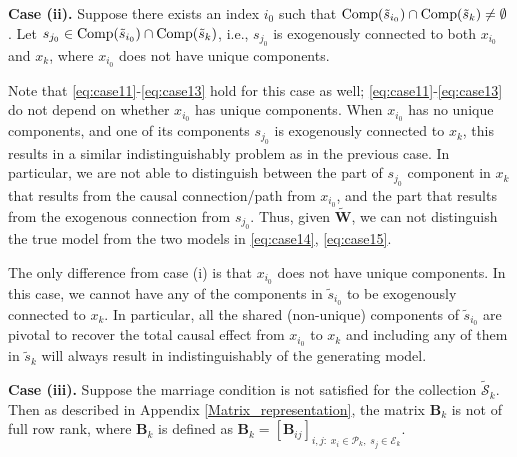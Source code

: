 \documentclass[12pt]{article}
\newcommand{\setS}{\mathcal{S}}
\newcommand{\bB}{\mathbf{B}}
\newcommand{\bW}{\mathbf{W}}
\begin{document}

\textbf{Case (ii). } 
Suppose there exists an index $i_0$ such that ${\rm{Comp}}(\tilde{s}_{i_0})\cap {\rm{Comp}}(\tilde{s}_k) \neq \emptyset $. Let $s_{j_0}\in {\rm{Comp}}(\tilde{s}_{i_0})\cap {\rm{Comp}}(\tilde{s}_k)$, i.e., $s_{j_0}$ is exogenously connected to both $x_{i_0}$ and $x_k$, where $x_{i_0}$ does not have unique components.

Note that \eqref{eq:case11}-\eqref{eq:case13} hold for this case as well; \eqref{eq:case11}-\eqref{eq:case13} do not depend on whether $x_{i_0}$ has unique components. When $x_{i_0}$ has no unique components, and one of its components $s_{j_0}$ is exogenously connected to $x_k$, this results in a similar indistinguishably problem as in the previous case. In particular, we are not able to distinguish between the part of $s_{j_0}$ component in $x_k$ that results from the causal connection/path from $x_{i_0}$, and the part that results from the exogenous connection from $s_{j_0}$. Thus, given $\tilde{\bW}$, we can not distinguish the true model from the two models in \eqref{eq:case14}, \eqref{eq:case15}.

The only difference from case (i) is that $x_{i_0}$ does not have unique components. In this case, we cannot have any of the components in $\tilde{s}_{i_0}$ to be exogenously connected to $x_k$. In particular, all the shared (non-unique) components of $\tilde{s}_{i_0}$ are pivotal to recover the total causal effect from $x_{i_0}$ to $x_{k}$ and including any of them in $\tilde{s}_k$ will always result in indistinguishably of the generating model. 



\textbf{Case (iii). } 
Suppose the marriage condition is not satisfied for the collection $\tilde{\setS}_k$. Then as described in Appendix \ref{Matrix_representation}, the matrix $\bB_k$ is not of full row rank, where $\bB_k$ is defined as
$\bB_k = [\bB_{ij}]_{i,j:\;x_i\in \mathcal{P}_k, \;s_j\in \mathcal{E}_k}$.
\end{document}
